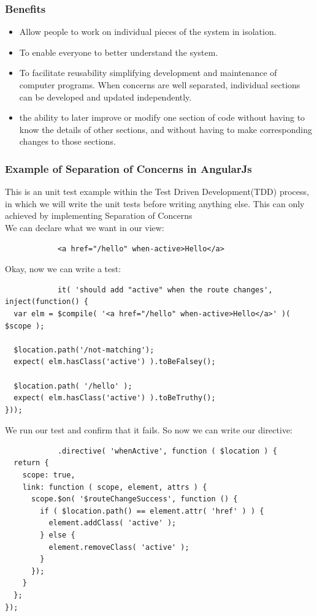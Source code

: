 \documentclass[14pt,a4paper]{extreport}
\begin{document}
			\subsubsection{Benefits}
		\begin{itemize}
		\item Allow people to work on individual pieces of the system in isolation.
		\item To enable everyone to better understand the system.
		\item To facilitate reusability simplifying development and maintenance of computer programs. When concerns are well separated, individual sections can be developed and updated independently.
		\item the ability to later improve or modify one section of code without having to know the details of other sections, and without having to make corresponding changes to those sections.
		\end{itemize}
			\subsubsection{Example of Separation of Concerns in AngularJs}
			This is an unit test example within the Test Driven Development(TDD) process, in which we will write the unit tests before writing anything else. This can only achieved by implementing Separation of Concerns
			\\
			We can declare what we want in our view:
			\begin{verbatim}
			<a href="/hello" when-active>Hello</a>
			\end{verbatim}
			
			Okay, now we can write a test:
			\begin{verbatim}
			it( 'should add "active" when the route changes', inject(function() {
  var elm = $compile( '<a href="/hello" when-active>Hello</a>' )( $scope );

  $location.path('/not-matching');
  expect( elm.hasClass('active') ).toBeFalsey();

  $location.path( '/hello' );
  expect( elm.hasClass('active') ).toBeTruthy();
}));

			\end{verbatim}
			We run our test and confirm that it fails. So now we can write our directive:
			\begin{verbatim}
			.directive( 'whenActive', function ( $location ) {
  return {
    scope: true,
    link: function ( scope, element, attrs ) {
      scope.$on( '$routeChangeSuccess', function () {
        if ( $location.path() == element.attr( 'href' ) ) {
          element.addClass( 'active' );
        } else {
          element.removeClass( 'active' );
        }
      });
    }
  };
});

			\end{verbatim}
\end{document}
